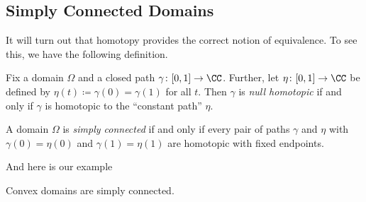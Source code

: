 \subsection{Simply Connected Domains}
It will turn out that homotopy provides the correct notion of equivalence. To see this, we have the following definition.
\begin{definition}
	Fix a domain $\Omega$ and a closed path $\gamma\colon [0,1]\to\CC$. Further, let $\eta\colon [0,1]\to\CC$ be defined by $\eta(t)\coloneqq \gamma(0)=\gamma(1)$ for all $t$. Then $\gamma$ is \textit{null homotopic} if and only if $\gamma$ is homotopic to the ``constant path'' $\eta$.
\end{definition}
\begin{definition}
	A domain $\Omega$ is \textit{simply connected} if and only if every pair of paths $\gamma$ and $\eta$ with $\gamma(0)=\eta(0)$ and $\gamma(1)=\eta(1)$ are homotopic with fixed endpoints.
\end{definition}
And here is our example
\begin{lemma}
	Convex domains are simply connected.
\end{lemma}
